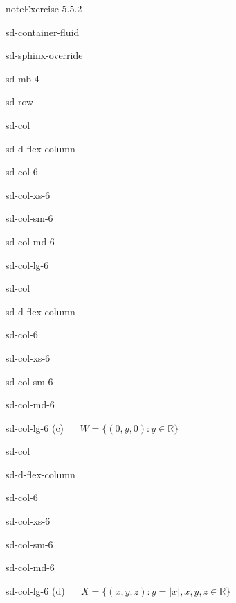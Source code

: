 \documentclass[letterpaper,10pt,english]{jupyterBook}
\begin{document}
\begin{sphinxadmonition}{note}{Exercise 5.5.2}
\begin{sphinxuseclass}{sd-container-fluid}
\begin{sphinxuseclass}{sd-sphinx-override}
\begin{sphinxuseclass}{sd-mb-4}
\begin{sphinxuseclass}{sd-row}
\begin{sphinxuseclass}{sd-col}
\begin{sphinxuseclass}{sd-d-flex-column}
\begin{sphinxuseclass}{sd-col-6}
\begin{sphinxuseclass}{sd-col-xs-6}
\begin{sphinxuseclass}{sd-col-sm-6}
\begin{sphinxuseclass}{sd-col-md-6}
\begin{sphinxuseclass}{sd-col-lg-6}
\end{sphinxuseclass}
\end{sphinxuseclass}
\end{sphinxuseclass}
\end{sphinxuseclass}
\end{sphinxuseclass}
\end{sphinxuseclass}
\end{sphinxuseclass}
\begin{sphinxuseclass}{sd-col}
\begin{sphinxuseclass}{sd-d-flex-column}
\begin{sphinxuseclass}{sd-col-6}
\begin{sphinxuseclass}{sd-col-xs-6}
\begin{sphinxuseclass}{sd-col-sm-6}
\begin{sphinxuseclass}{sd-col-md-6}
\begin{sphinxuseclass}{sd-col-lg-6}
\sphinxAtStartPar
(c)   \(W = \{ (0, y, 0) : y \in \mathbb{R} \}\)

\end{sphinxuseclass}
\end{sphinxuseclass}
\end{sphinxuseclass}
\end{sphinxuseclass}
\end{sphinxuseclass}
\end{sphinxuseclass}
\end{sphinxuseclass}
\begin{sphinxuseclass}{sd-col}
\begin{sphinxuseclass}{sd-d-flex-column}
\begin{sphinxuseclass}{sd-col-6}
\begin{sphinxuseclass}{sd-col-xs-6}
\begin{sphinxuseclass}{sd-col-sm-6}
\begin{sphinxuseclass}{sd-col-md-6}
\begin{sphinxuseclass}{sd-col-lg-6}
\sphinxAtStartPar
(d)   \(X = \{ (x, y, z) : y = |x|, x, y, z \in \mathbb{R}\}\)

\end{sphinxuseclass}
\end{sphinxuseclass}
\end{sphinxuseclass}
\end{sphinxuseclass}
\end{sphinxuseclass}
\end{sphinxuseclass}
\end{sphinxuseclass}
\end{sphinxuseclass}
\end{sphinxuseclass}
\end{sphinxuseclass}
\end{sphinxuseclass}\end{sphinxadmonition}
\end{document}
